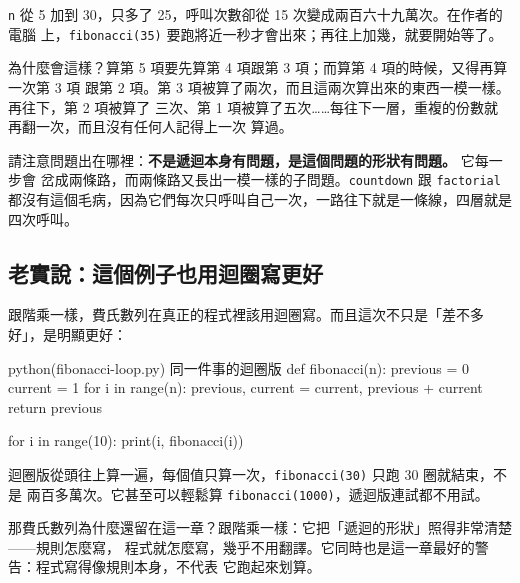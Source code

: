 \texttt{n} 從 5 加到 30，只多了 25，呼叫次數卻從 15 次變成兩百六十九萬次。在作者的電腦
上，\texttt{fibonacci(35)} 要跑將近一秒才會出來；再往上加幾，就要開始等了。

為什麼會這樣？算第 5 項要先算第 4 項跟第 3 項；而算第 4 項的時候，又得再算一次第 3 項
跟第 2 項。第 3 項被算了兩次，而且這兩次算出來的東西一模一樣。再往下，第 2 項被算了
三次、第 1 項被算了五次……每往下一層，重複的份數就再翻一次，而且沒有任何人記得上一次
算過。

請注意問題出在哪裡：\textbf{不是遞迴本身有問題，是這個問題的形狀有問題。} 它每一步會
岔成兩條路，而兩條路又長出一模一樣的子問題。\texttt{countdown} 跟 \texttt{factorial}
都沒有這個毛病，因為它們每次只呼叫自己一次，一路往下就是一條線，四層就是四次呼叫。


\subsection*{老實說：這個例子也用迴圈寫更好}

跟階乘一樣，費氏數列在真正的程式裡該用迴圈寫。而且這次不只是「差不多好」，是明顯更好：

\begin{example}{python}{(fibonacci-loop.py) 同一件事的迴圈版}
def fibonacci(n):
    previous = 0
    current = 1
    for i in range(n):
        previous, current = current, previous + current
    return previous


for i in range(10):
    print(i, fibonacci(i))
\end{example}


迴圈版從頭往上算一遍，每個值只算一次，\texttt{fibonacci(30)} 只跑 30 圈就結束，不是
兩百多萬次。它甚至可以輕鬆算 \texttt{fibonacci(1000)}，遞迴版連試都不用試。

那費氏數列為什麼還留在這一章？跟階乘一樣：它把「遞迴的形狀」照得非常清楚——規則怎麼寫，
程式就怎麼寫，幾乎不用翻譯。它同時也是這一章最好的警告：程式寫得像規則本身，不代表
它跑起來划算。


